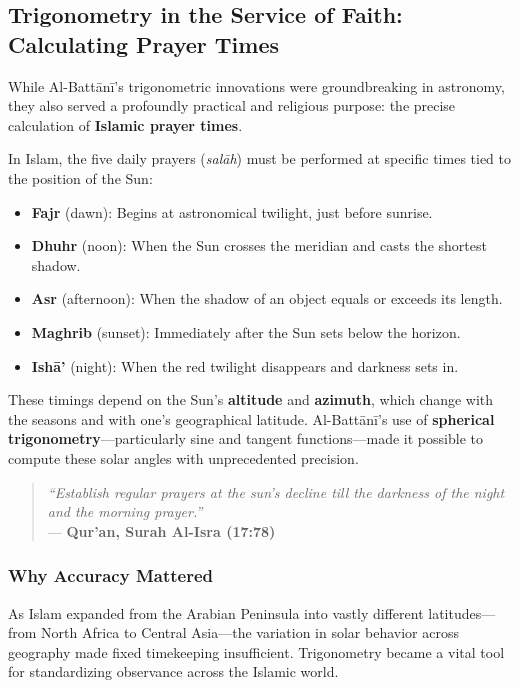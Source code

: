 \subsection{Trigonometry in the Service of Faith: Calculating Prayer Times}

While Al-Battānī’s trigonometric innovations were groundbreaking in astronomy, they also served a profoundly practical and religious purpose: the precise calculation of \textbf{Islamic prayer times}.


In Islam, the five daily prayers (\textit{salāh}) must be performed at specific times tied to the position of the Sun:

\begin{itemize}
    \item \textbf{Fajr} (dawn): Begins at astronomical twilight, just before sunrise.
    \item \textbf{Dhuhr} (noon): When the Sun crosses the meridian and casts the shortest shadow.
    \item \textbf{Asr} (afternoon): When the shadow of an object equals or exceeds its length.
    \item \textbf{Maghrib} (sunset): Immediately after the Sun sets below the horizon.
    \item \textbf{Ishā'} (night): When the red twilight disappears and darkness sets in.
\end{itemize}

These timings depend on the Sun’s \textbf{altitude} and \textbf{azimuth}, which change with the seasons and with one’s geographical latitude. Al-Battānī’s use of \textbf{spherical trigonometry}—particularly sine and tangent functions—made it possible to compute these solar angles with unprecedented precision.

\begin{quote}
\textit{“Establish regular prayers at the sun's decline till the darkness of the night and the morning prayer.”} \\
\hfill — \textbf{Qur’an, Surah Al-Isra (17:78)}
\end{quote}

\subsubsection{Why Accuracy Mattered}

As Islam expanded from the Arabian Peninsula into vastly different latitudes—from North Africa to Central Asia—the variation in solar behavior across geography made fixed timekeeping insufficient. Trigonometry became a vital tool for standardizing observance across the Islamic world.


